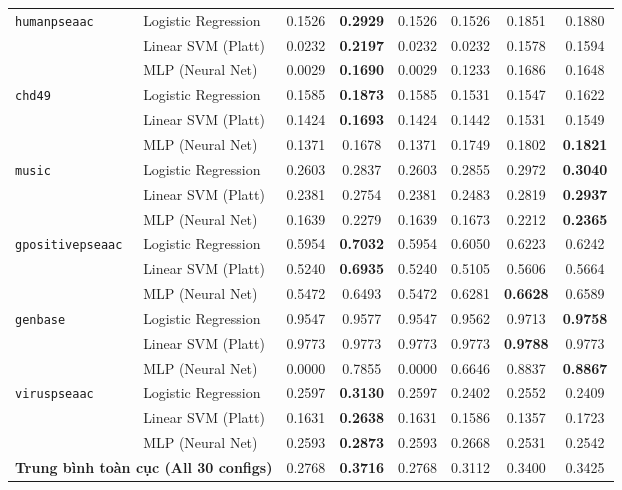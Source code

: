 \documentclass[10pt,a4paper,twoside]{article}
\begin{document}
\begin{table}[H]
{\begin{tabular}{llcccccc}
\midrule
\multirow{3}{*}{\texttt{humanpseaac}} & Logistic Regression & 0.1526 & \textbf{0.2929} & 0.1526 & 0.1526 & 0.1851 & 0.1880 \\
 & Linear SVM (Platt) & 0.0232 & \textbf{0.2197} & 0.0232 & 0.0232 & 0.1578 & 0.1594 \\
 & MLP (Neural Net) & 0.0029 & \textbf{0.1690} & 0.0029 & 0.1233 & 0.1686 & 0.1648 \\
\midrule
\multirow{3}{*}{\texttt{chd49}} & Logistic Regression & 0.1585 & \textbf{0.1873} & 0.1585 & 0.1531 & 0.1547 & 0.1622 \\
 & Linear SVM (Platt) & 0.1424 & \textbf{0.1693} & 0.1424 & 0.1442 & 0.1531 & 0.1549 \\
 & MLP (Neural Net) & 0.1371 & 0.1678 & 0.1371 & 0.1749 & 0.1802 & \textbf{0.1821} \\
\midrule
\multirow{3}{*}{\texttt{music}} & Logistic Regression & 0.2603 & 0.2837 & 0.2603 & 0.2855 & 0.2972 & \textbf{0.3040} \\
 & Linear SVM (Platt) & 0.2381 & 0.2754 & 0.2381 & 0.2483 & 0.2819 & \textbf{0.2937} \\
 & MLP (Neural Net) & 0.1639 & 0.2279 & 0.1639 & 0.1673 & 0.2212 & \textbf{0.2365} \\
\midrule
\multirow{3}{*}{\texttt{gpositivepseaac}} & Logistic Regression & 0.5954 & \textbf{0.7032} & 0.5954 & 0.6050 & 0.6223 & 0.6242 \\
 & Linear SVM (Platt) & 0.5240 & \textbf{0.6935} & 0.5240 & 0.5105 & 0.5606 & 0.5664 \\
 & MLP (Neural Net) & 0.5472 & 0.6493 & 0.5472 & 0.6281 & \textbf{0.6628} & 0.6589 \\
\midrule
\multirow{3}{*}{\texttt{genbase}} & Logistic Regression & 0.9547 & 0.9577 & 0.9547 & 0.9562 & 0.9713 & \textbf{0.9758} \\
 & Linear SVM (Platt) & 0.9773 & 0.9773 & 0.9773 & 0.9773 & \textbf{0.9788} & 0.9773 \\
 & MLP (Neural Net) & 0.0000 & 0.7855 & 0.0000 & 0.6646 & 0.8837 & \textbf{0.8867} \\
\midrule
\multirow{3}{*}{\texttt{viruspseaac}} & Logistic Regression & 0.2597 & \textbf{0.3130} & 0.2597 & 0.2402 & 0.2552 & 0.2409 \\
 & Linear SVM (Platt) & 0.1631 & \textbf{0.2638} & 0.1631 & 0.1586 & 0.1357 & 0.1723 \\
 & MLP (Neural Net) & 0.2593 & \textbf{0.2873} & 0.2593 & 0.2668 & 0.2531 & 0.2542 \\
\midrule
\multicolumn{2}{l}{\textbf{Trung bình toàn cục (All 30 configs)}} & 0.2768 & \textbf{0.3716} & 0.2768 & 0.3112 & 0.3400 & 0.3425 \\
\bottomrule
\end{tabular}%
}
\end{table}
\clearpage
\end{document}
